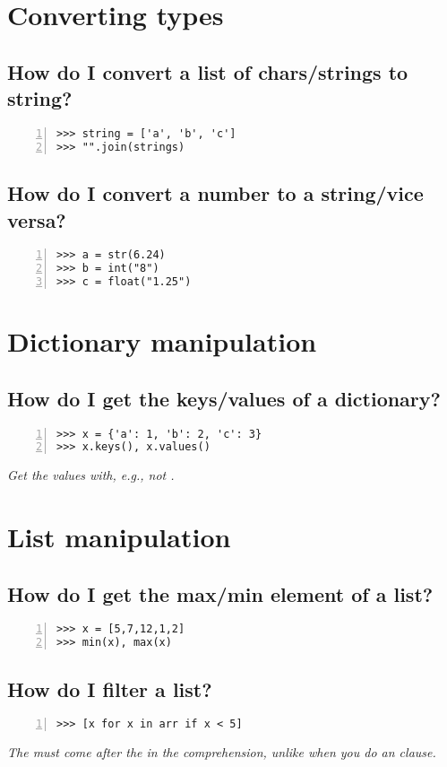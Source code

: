 \documentclass[12pt]{article}
\begin{document}
\section{Converting types}
\subsection{How do I convert a list of chars/strings to string?}
\begin{lstlisting}[numbers=left]
>>> string = ['a', 'b', 'c']
>>> "".join(strings)
\end{lstlisting}

\subsection{How do I convert a number to a string/vice versa?}
\begin{lstlisting}[numbers=left]
>>> a = str(6.24)
>>> b = int("8")
>>> c = float("1.25")
\end{lstlisting}

\section{Dictionary manipulation}
\subsection{How do I get the keys/values of a dictionary?}
\begin{lstlisting}[numbers=left]
>>> x = {'a': 1, 'b': 2, 'c': 3}
>>> x.keys(), x.values()
\end{lstlisting}
\emph{Get the values with, e.g.,  not .}

\section{List manipulation}
\subsection{How do I get the max/min element of a list?}
\begin{lstlisting}[numbers=left]
>>> x = [5,7,12,1,2]
>>> min(x), max(x)
\end{lstlisting}

\subsection{How do I filter a list?}
\begin{lstlisting}[numbers=left]
>>> [x for x in arr if x < 5]
\end{lstlisting}
\emph{The  must come after the  in the comprehension, unlike when you do an  clause.}
\end{document}
